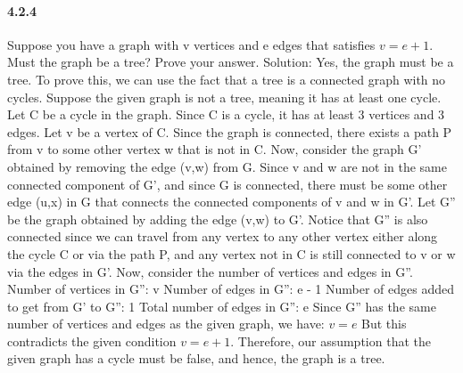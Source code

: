 \documentclass{article}
\begin{document}
\paragraph{4.2.4}Suppose you have a graph with v vertices and e edges that satisfies
$v = e + 1$. Must the graph be a tree? Prove your answer.\newline
Solution:\newline
Yes, the graph must be a tree.\newline
To prove this, we can use the fact that a tree is a connected graph with no cycles.\newline
Suppose the given graph is not a tree, meaning it has at least one cycle. Let C be a cycle in the graph. Since C is a cycle, it has at least 3 vertices and 3 edges. Let v be a vertex of C. Since the graph is connected, there exists a path P from v to some other vertex w that is not in C.\newline
Now, consider the graph G' obtained by removing the edge (v,w) from G. Since v and w are not in the same connected component of G', and since G is connected, there must be some other edge (u,x) in G that connects the connected components of v and w in G'.\newline
Let G'' be the graph obtained by adding the edge (v,w) to G'. Notice that G'' is also connected since we can travel from any vertex to any other vertex either along the cycle C or via the path P, and any vertex not in C is still connected to v or w via the edges in G'.\newline
Now, consider the number of vertices and edges in G''.\newline
Number of vertices in G'': v\newline
Number of edges in G'': e - 1\newline
Number of edges added to get from G' to G'': 1\newline
Total number of edges in G'': e\newline
Since G'' has the same number of vertices and edges as the given graph, we have:\newline
$v = e$\newline
But this contradicts the given condition $v = e + 1$. Therefore, our assumption that the given graph has a cycle must be false, and hence, the graph is a tree.
\end{document}
